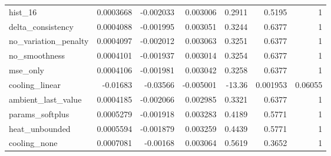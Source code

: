 \begin{tabular}{lrrrrrr}
hist\_16 & 0.0003668 & -0.002033 & 0.003006 & 0.2911 & 0.5195 & 1 \\
delta\_consistency & 0.0004088 & -0.001995 & 0.003051 & 0.3244 & 0.6377 & 1 \\
no\_variation\_penalty & 0.0004097 & -0.002012 & 0.003063 & 0.3251 & 0.6377 & 1 \\
no\_smoothness & 0.0004101 & -0.001937 & 0.003014 & 0.3254 & 0.6377 & 1 \\
mse\_only & 0.0004106 & -0.001981 & 0.003042 & 0.3258 & 0.6377 & 1 \\
cooling\_linear & -0.01683 & -0.03566 & -0.005001 & -13.36 & 0.001953 & 0.06055 \\
ambient\_last\_value & 0.0004185 & -0.002066 & 0.002985 & 0.3321 & 0.6377 & 1 \\
params\_softplus & 0.0005279 & -0.001918 & 0.003283 & 0.4189 & 0.5771 & 1 \\
heat\_unbounded & 0.0005594 & -0.001879 & 0.003259 & 0.4439 & 0.5771 & 1 \\
cooling\_none & 0.0007081 & -0.00168 & 0.003064 & 0.5619 & 0.3652 & 1 \\
\bottomrule
\end{tabular}
